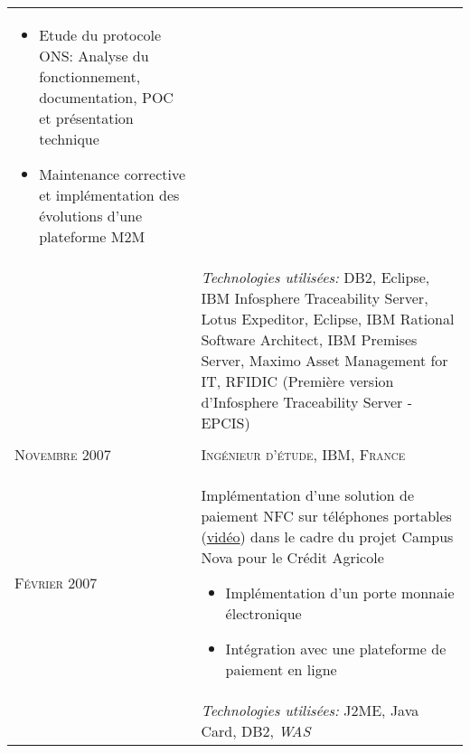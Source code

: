 \begin{longtable}{R{2.5cm}|p{14.8cm}}
{\begin{itemize}
 	 	  \item Etude du protocole ONS: Analyse du fonctionnement, documentation, POC et présentation technique
 	 	  \item Maintenance corrective et implémentation des évolutions d'une plateforme M2M
 		\end{itemize}
 		\vspace{-1em}
 	}\\&
 	\footnotesize{\emph{Technologies utilisées:} DB2, Eclipse, IBM Infosphere Traceability Server, Lotus Expeditor, Eclipse, 
 	IBM Rational Software Architect, IBM Premises Server, Maximo Asset Management for IT, RFIDIC (Première version d'Infosphere Traceability Server - EPCIS) }\\
 \\
 	\textsc{Novembre 2007} & \textsc{Ingénieur d'étude, IBM, France} \\
 	\textsc{Février 2007}&
 	\footnotesize{
 	 	Implémentation d'une solution de paiement NFC sur téléphones portables (\href{http://www.nouvo.ch/s-007}{vidéo}) 
 	 	dans le cadre du projet Campus Nova pour le Crédit Agricole
 	 	\begin{itemize}
 	 	  \item Implémentation d'un porte monnaie électronique
 	 	  \item Intégration avec une plateforme de paiement en ligne
 	 	\end{itemize}
 	 	
	}\\&
	\vspace{-1em}
 	\footnotesize{\emph{Technologies utilisées:} J2ME, Java Card, DB2, \emph{WAS}}\\
\end{longtable}
